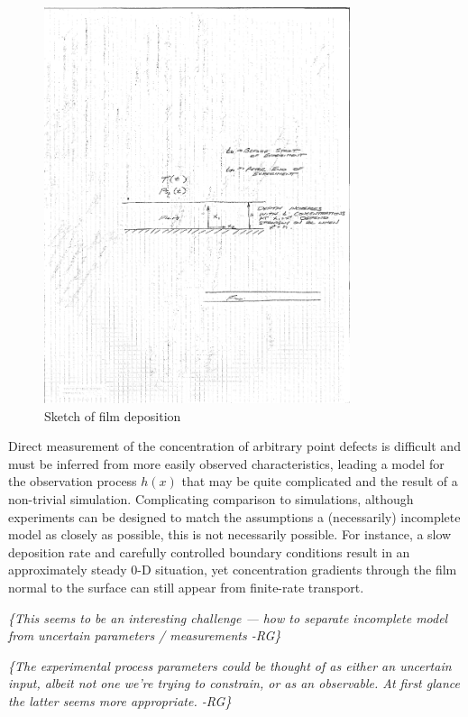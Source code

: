 \documentclass[11pt]{article}
\newcommand{\remrg}[1]{ {\it \color{drkgrn} \{#1 -RG\}}}
\begin{document}
\begin{figure}[h]
  \centering
  \includegraphics[width=0.8\textwidth]{pd_sketch.pdf}
  \caption{Sketch of film deposition}
  \label{fig:film}
\end{figure}

Direct measurement of the concentration of arbitrary point defects is
difficult and must be inferred from more easily observed
characteristics, leading a model for the observation process $h(x)$
that may be quite complicated and the result of a non-trivial
simulation. Complicating comparison to simulations, although
experiments can be designed to match the assumptions a (necessarily)
incomplete model as closely as possible, this is not necessarily
possible. For instance, a slow deposition rate and carefully
controlled boundary conditions result in an approximately steady 0-D
situation, yet concentration gradients through the film normal to the
surface can still appear from finite-rate transport. 

\remrg{This seems to be an interesting challenge --- how to separate
  incomplete model from uncertain parameters / measurements}

\remrg{The experimental process parameters could be
  thought of as either an uncertain input, albeit not one we're
  trying to constrain, or as an observable. At first glance the latter
  seems more appropriate.}
\end{document}
